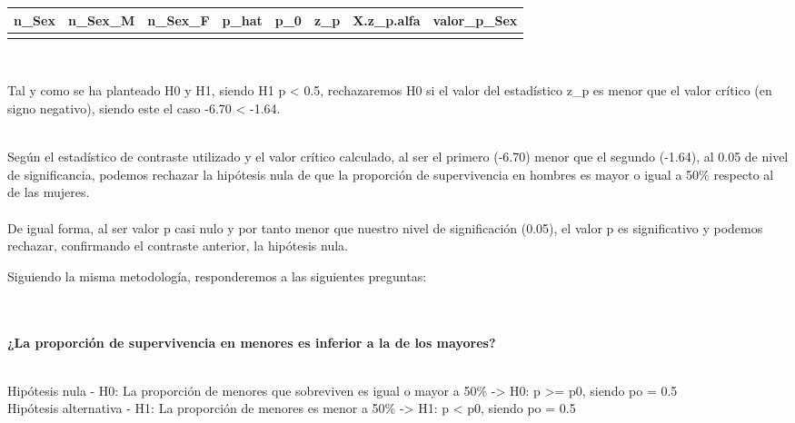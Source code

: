 \documentclass[
]{article}
\begin{document}
\begin{table}
\centering
\begin{tabular}[t]{rrrrrrrr}
\toprule
n\_Sex & n\_Sex\_M & n\_Sex\_F & p\_hat & p\_0 & z\_p & X.z\_p.alfa & valor\_p\_Sex\\
\midrule
\cellcolor{gray!6}{342} & \cellcolor{gray!6}{109} & \cellcolor{gray!6}{233} & \cellcolor{gray!6}{0.3187135} & \cellcolor{gray!6}{0.5} & \cellcolor{gray!6}{-6.705152} & \cellcolor{gray!6}{-1.644854} & \cellcolor{gray!6}{0}\\
\bottomrule
\end{tabular}
\end{table}

\texttt{}\\
\texttt{}

Tal y como se ha planteado H0 y H1, siendo H1 p \textless{} 0.5,
rechazaremos H0 si el valor del estadístico z\_p es menor que el valor
crítico (en signo negativo), siendo este el caso -6.70 \textless{}
-1.64.

\texttt{}\\
Según el estadístico de contraste utilizado y el valor crítico
calculado, al ser el primero (-6.70) menor que el segundo (-1.64), al
0.05 de nivel de significancia, podemos rechazar la hipótesis nula de
que la proporción de supervivencia en hombres es mayor o igual a 50\%
respecto al de las mujeres.\\
\texttt{}~\\
De igual forma, al ser valor p casi nulo y por tanto menor que nuestro
nivel de significación (0.05), el valor p es significativo y podemos
rechazar, confirmando el contraste anterior, la hipótesis nula.\\
\texttt{}

Siguiendo la misma metodología, responderemos a las siguientes
preguntas:

\texttt{}\\
\texttt{}~\\
\textbf{¿La proporción de supervivencia en menores es inferior a la de
los mayores?}

\texttt{}\\
Hipótesis nula - H0: La proporción de menores que sobreviven es igual o
mayor a 50\% -\textgreater{} H0: p \textgreater= p0, siendo po = 0.5\\
Hipótesis alternativa - H1: La proporción de menores es menor a 50\%
-\textgreater{} H1: p \textless{} p0, siendo po = 0.5\\
\texttt{}
\end{document}
